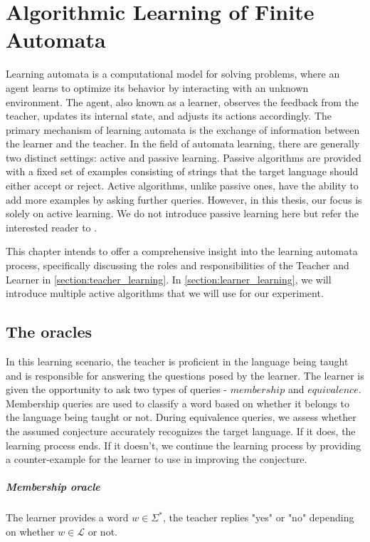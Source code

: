 \chapter{Algorithmic Learning of Finite Automata}\label{chapter:learning_algorithm}
Learning automata is a computational model for solving problems, where an agent learns 
to optimize its behavior by interacting with an unknown environment. 
The agent, also known as a learner, 
observes the feedback from the teacher, updates its internal state, and adjusts its 
actions accordingly. 
The primary mechanism of learning automata is the exchange of information between the learner and the teacher.
In the field of automata learning, there are generally two distinct settings: 
active and passive learning. Passive algorithms are provided with a fixed set of 
examples consisting of strings that the target language should either accept or reject. 
Active algorithms, unlike passive ones, have the ability to add more examples
by asking further queries.
However, in this thesis, our focus is solely on active learning.
We do not introduce passive learning here but refer the interested reader to \cite*{aichernig2022active}.

This chapter intends to offer a comprehensive insight into the 
learning automata process, specifically discussing the roles and 
responsibilities of the Teacher and Learner in \autoref{section:teacher_learning}. 
In \autoref{section:learner_learning}, 
we will introduce multiple active algorithms that we will use for our experiment.
\section{The oracles}\label{section:teacher_learning}
In this learning scenario, the teacher is proficient in the language being taught 
and is responsible for answering the questions posed by the learner. The learner 
is given the opportunity to ask two types of queries - $membership$ and $equivalence$. 
Membership queries are used to classify a word based on whether it belongs to the 
language being taught or not. 
During equivalence queries, we assess whether the assumed conjecture accurately recognizes the target language. 
If it does, the learning process ends. 
If it doesn't, we continue the learning process by providing a counter-example for the learner to use in improving the conjecture.
\paragraph*{Membership oracle} 
The learner provides a word $w \in \Sigma^{*}$, the teacher replies "yes" 
or "no" depending on whether $w \in \mathcal{L}$ or not.
